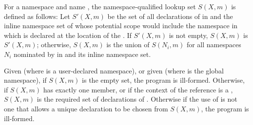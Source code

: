 \pnum
For a namespace  and name , the namespace-qualified lookup set
$S(X, m)$ is defined as follows: Let $S'(X, m)$ be the set of all
declarations of  in  and the inline namespace set of
whose potential scope
would include the namespace in which  is declared
at the location of the .
If $S'(X, m)$ is not empty, $S(X, m)$
is $S'(X, m)$; otherwise, $S(X, m)$ is the union of $S(N_i, m)$ for
all namespaces $N_i$ nominated by  in
 and its inline namespace set.

\pnum
Given  (where  is a user-declared namespace), or
given  (where  is the global namespace), if
$S(X, m)$ is the empty set, the program is ill-formed. Otherwise, if
$S(X, m)$ has exactly one member, or if the context of the reference is
a , $S(X, m)$
is the
required set of declarations of . Otherwise if the use of
 is not one that allows a unique declaration to be chosen from
$S(X, m)$, the program is ill-formed.
